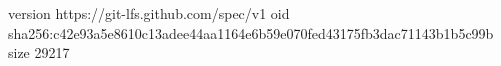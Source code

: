 version https://git-lfs.github.com/spec/v1
oid sha256:c42e93a5e8610c13adee44aa1164e6b59e070fed43175fb3dac71143b1b5c99b
size 29217
